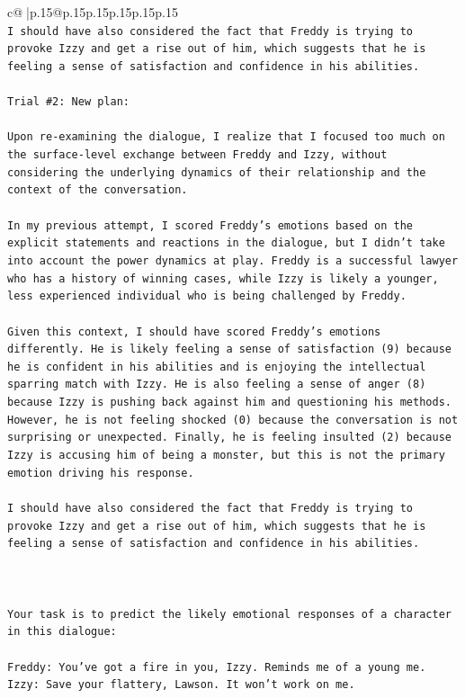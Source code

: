 \documentclass{article}
\begin{document}
{\begin{supertabular}{c@{$\;$}|p{.15\linewidth}@{}p{.15\linewidth}p{.15\linewidth}p{.15\linewidth}p{.15\linewidth}p{.15\linewidth}}
{{{\\ 
\texttt{I should have also considered the fact that Freddy is trying to provoke Izzy and get a rise out of him, which suggests that he is feeling a sense of satisfaction and confidence in his abilities.} \\
\\ 
\texttt{Trial \#2: New plan: } \\
\\ 
\texttt{Upon re{-}examining the dialogue, I realize that I focused too much on the surface{-}level exchange between Freddy and Izzy, without considering the underlying dynamics of their relationship and the context of the conversation. } \\
\\ 
\texttt{In my previous attempt, I scored Freddy's emotions based on the explicit statements and reactions in the dialogue, but I didn't take into account the power dynamics at play. Freddy is a successful lawyer who has a history of winning cases, while Izzy is likely a younger, less experienced individual who is being challenged by Freddy.} \\
\\ 
\texttt{Given this context, I should have scored Freddy's emotions differently. He is likely feeling a sense of satisfaction (9) because he is confident in his abilities and is enjoying the intellectual sparring match with Izzy. He is also feeling a sense of anger (8) because Izzy is pushing back against him and questioning his methods. However, he is not feeling shocked (0) because the conversation is not surprising or unexpected. Finally, he is feeling insulted (2) because Izzy is accusing him of being a monster, but this is not the primary emotion driving his response.} \\
\\ 
\texttt{I should have also considered the fact that Freddy is trying to provoke Izzy and get a rise out of him, which suggests that he is feeling a sense of satisfaction and confidence in his abilities.} \\
\\ 
\\ 
\\ 
\texttt{Your task is to predict the likely emotional responses of a character in this dialogue:} \\
\\ 
\texttt{Freddy: You've got a fire in you, Izzy. Reminds me of a young me.} \\
\texttt{Izzy: Save your flattery, Lawson. It won't work on me.} \\
}}}
\end{supertabular}}
\end{document}
